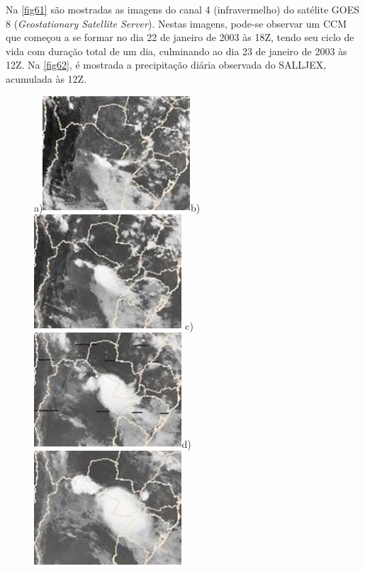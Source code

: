 Na \autoref{fig61} são mostradas as imagens do canal 4 (infravermelho) do satélite GOES 8 (\textit{Geostationary Satellite Server}). Nestas imagens, pode-se observar um CCM que começou a se formar no dia 22 de janeiro de 2003 às 18Z, tendo seu ciclo de vida com duração total de um dia, culminando ao dia 23 de janeiro de 2003 às 12Z. Na \autoref{fig62}, é mostrada a precipitação diária observada do SALLJEX, acumulada às 12Z.

\begin{figure}
\centering
a)\includegraphics[height=4.3cm]{./figs/sat01.png}\hspace{0.2cm}b)\includegraphics[height=4.3cm]{./figs/sat02.png}\hspace{0.2cm}
c)\includegraphics[height=4.3cm]{./figs/sat03.png}\hspace{0.2cm}d)\includegraphics[height=4.3cm]{./figs/sat04.png}

\end{figure}
